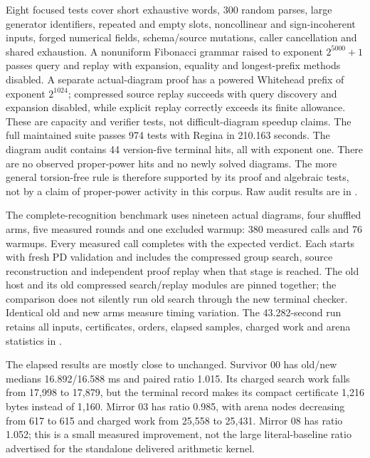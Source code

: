 Eight focused tests cover short exhaustive words, 300 random parses,
large generator identifiers, repeated and empty slots, noncollinear and
sign-incoherent inputs, forged numerical fields, schema/source mutations,
caller cancellation and shared exhaustion. A nonuniform Fibonacci grammar
raised to exponent $2^{5000}+1$ passes query and replay with expansion,
equality and longest-prefix methods disabled. A separate actual-diagram
proof has a powered Whitehead prefix of exponent $2^{1024}$; compressed
source replay succeeds with query discovery and expansion disabled, while
explicit replay correctly exceeds its finite allowance. These are
capacity and verifier tests, not difficult-diagram speedup claims.
The full maintained suite passes 974 tests with Regina in 210.163 seconds.
The diagram audit contains 44 version-five terminal hits, all with exponent
one. There are no observed proper-power hits and no newly solved diagrams.
The more general torsion-free rule is therefore supported by its proof
and algebraic tests, not by a claim of proper-power activity in this corpus.
Raw audit results are in .



The complete-recognition benchmark uses nineteen actual diagrams, four
shuffled arms, five measured rounds and one excluded warmup: 380 measured
calls and 76 warmups. Every measured call completes with the expected
verdict. Each starts with fresh PD validation and includes the compressed
group search, source reconstruction and independent proof replay when
that stage is reached. The old host and its old compressed search/replay
modules are pinned together; the comparison does not silently run old
search through the new terminal checker. Identical old and new arms
measure timing variation. The 43.282-second run retains all inputs,
certificates, orders, elapsed samples, charged work and arena statistics
in .

The elapsed results are mostly close to unchanged. Survivor 00 has
old/new medians 16.892/16.588 ms and paired ratio 1.015. Its charged search
work falls from 17,998 to 17,879, but the terminal record makes its compact
certificate 1,216 bytes instead of 1,160. Mirror 03 has ratio 0.985,
with arena nodes decreasing from 617 to 615 and charged work from
25,558 to 25,431. Mirror 08 has ratio 1.052; this is a small measured
improvement, not the large literal-baseline ratio advertised for the
standalone delivered arithmetic kernel.

